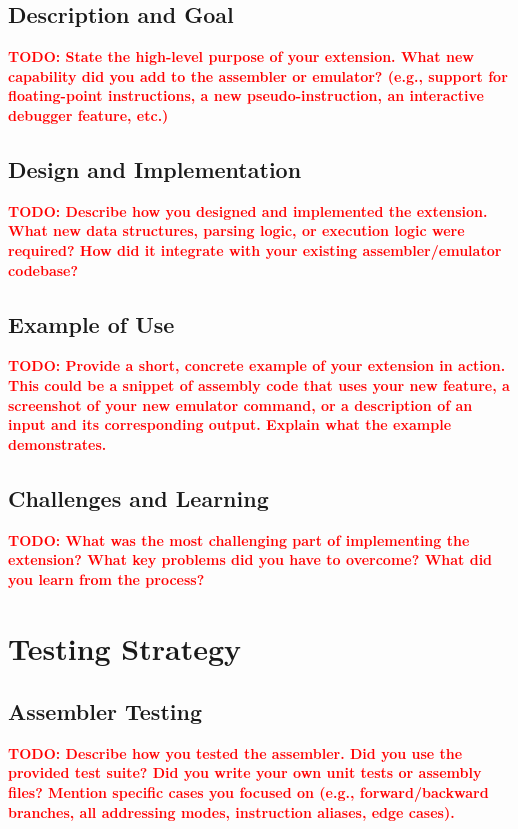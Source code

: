 \documentclass[11pt]{article}
\newcommand{\todo}[1]{\textcolor{red}{\textbf{TODO: #1}}}
\begin{document}
\subsection{Description and Goal}
\todo{State the high-level purpose of your extension. What new capability did you add to the assembler or emulator? (e.g., support for floating-point instructions, a new pseudo-instruction, an interactive debugger feature, etc.)}

\subsection{Design and Implementation}
\todo{Describe how you designed and implemented the extension. What new data structures, parsing logic, or execution logic were required? How did it integrate with your existing assembler/emulator codebase?}

\subsection{Example of Use}
\todo{Provide a short, concrete example of your extension in action. This could be a snippet of assembly code that uses your new feature, a screenshot of your new emulator command, or a description of an input and its corresponding output. Explain what the example demonstrates.}

\subsection{Challenges and Learning}
\todo{What was the most challenging part of implementing the extension? What key problems did you have to overcome? What did you learn from the process?}


\section{Testing Strategy}

\subsection{Assembler Testing}
\todo{Describe how you tested the assembler. Did you use the provided test suite? Did you write your own unit tests or assembly files? Mention specific cases you focused on (e.g., forward/backward branches, all addressing modes, instruction aliases, edge cases).}
\end{document}
